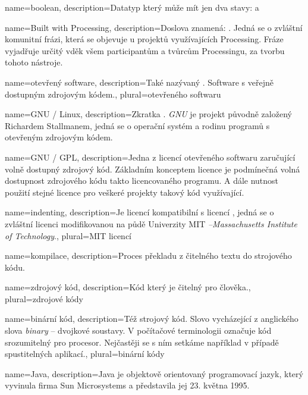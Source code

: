 {
  name={boolean},
  description={Datatyp který může mít jen dva stavy:  a }
}

{
	name={Built with Processing},
	description={Doslova znamená: . Jedná se o zvláštní komunitní frázi, která se objevuje u projektů využívajících Processing. Fráze vyjadřuje určitý vděk všem participantům a tvůrcům Processingu, za tvorbu tohoto nástroje.}
}

{
  name={otevřený software},
  description={Také nazývaný . Software s veřejně dostupným zdrojovým kódem.},
  plural={otevřeného softwaru}
}

{
  name={GNU / Linux},
  description={Zkratka . {\em GNU} je projekt původně založený Richardem Stallmanem, jedná se o operační systém a rodinu programů s otevřeným zdrojovým kódem.}
}

{
  name={GNU / GPL},
  description={Jedna z licencí otevřeného softwaru zaručující volně dostupný zdrojový kód. Základním konceptem licence je podmínečná volná dostupnost zdrojového kódu takto licencovaného programu. A dále nutnost použití stejné licence pro veškeré projekty takový kód využívající.}
}

{
  name={indenting},
  description={Je licencí kompatibilní s licencí , jedná se o zvláštní licenci modifikovanou na půdě Univerzity MIT {\em --Massachusetts Institute of Technology}.},
  plural={MIT licencí}
}


{
	name={kompilace},
	description={Proces překladu z čitelného textu do strojového kódu.}
}

{
	name={zdrojový kód},
	description={Kód který je čitelný pro člověka.},
	plural={zdrojové kódy}
}

{
	name={binární kód},
	description={Též strojový kód. Slovo vycházející z anglického slova {\em binary} -- dvojkové soustavy. V počítačové terminologii označuje kód srozumitelný pro procesor. Nejčastěji se s ním setkáme například v případě spustitelných aplikací.},
	plural={binární kódy}
}

{
	name={Java},
	description={Java je objektově orientovaný programovací jazyk, který vyvinula firma Sun Microsystems a představila jej 23. května 1995.}
}

